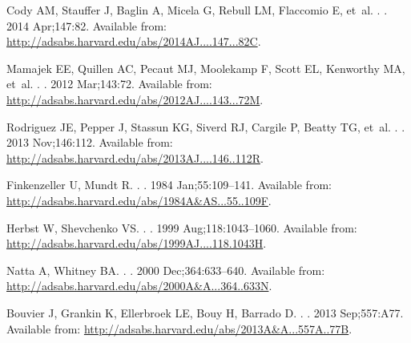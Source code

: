 \documentclass[]{rsos}
\begin{document}
\begin{thebibliography}{10}
{Cody} AM, {Stauffer} J, {Baglin} A, {Micela} G, {Rebull} LM, {Flaccomio} E,
  et~al.
.
\newblock \aj. 2014 Apr;147:82.
\newblock Available from:
  \url{http://adsabs.harvard.edu/abs/2014AJ....147...82C}.

{Mamajek} EE, {Quillen} AC, {Pecaut} MJ, {Moolekamp} F, {Scott} EL, {Kenworthy}
  MA, et~al.
.
\newblock \aj. 2012 Mar;143:72.
\newblock Available from:
  \url{http://adsabs.harvard.edu/abs/2012AJ....143...72M}.

{Rodriguez} JE, {Pepper} J, {Stassun} KG, {Siverd} RJ, {Cargile} P, {Beatty}
  TG, et~al.
.
\newblock \aj. 2013 Nov;146:112.
\newblock Available from:
  \url{http://adsabs.harvard.edu/abs/2013AJ....146..112R}.

{Finkenzeller} U, {Mundt} R.
.
\newblock \aaps. 1984 Jan;55:109--141.
\newblock Available from:
  \url{http://adsabs.harvard.edu/abs/1984A&AS...55..109F}.

{Herbst} W, {Shevchenko} VS.
.
\newblock \aj. 1999 Aug;118:1043--1060.
\newblock Available from:
  \url{http://adsabs.harvard.edu/abs/1999AJ....118.1043H}.

{Natta} A, {Whitney} BA.
.
\newblock \aap. 2000 Dec;364:633--640.
\newblock Available from:
  \url{http://adsabs.harvard.edu/abs/2000A&A...364..633N}.

{Bouvier} J, {Grankin} K, {Ellerbroek} LE, {Bouy} H, {Barrado} D.
.
\newblock \aap. 2013 Sep;557:A77.
\newblock Available from:
  \url{http://adsabs.harvard.edu/abs/2013A&A...557A..77B}.


\end{thebibliography}
\end{document}
